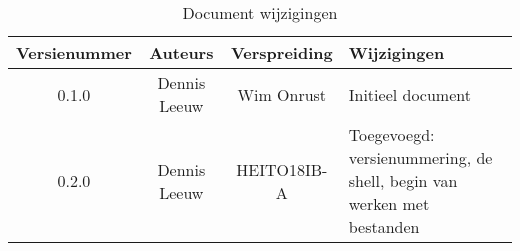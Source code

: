 \begin{flushleft}
\begin{table}[h!]
\centering
\begin{tabularx}{\textwidth}{ |c|c|c|X| }
\hline
	Versienummer &
	Auteurs &
	Verspreiding &
	Wijzigingen\\
\hline
	0.1.0 &
	Dennis Leeuw &
	Wim Onrust &
	Initieel document\\
\hline
	0.2.0 &
	Dennis Leeuw &
	HEITO18IB-A &
	Toegevoegd: versienummering, de shell, begin van werken met bestanden\\
\hline
\end{tabularx}
\caption{Document wijzigingen}
\label{table:1}
\end{table}
\end{flushleft}

